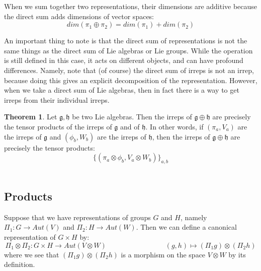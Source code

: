 \documentclass[11pt, oneside]{article}   	%
\theoremstyle{definition}
\newtheorem{theorem}{Theorem}[section]
\begin{document}
When we sum together two representations, their dimensions are additive because the direct sum adds 
dimensions of vector spaces:
\begin{equation}
	dim(\pi_1\oplus\pi_2) = dim(\pi_1) + dim(\pi_2)
\end{equation}

An important thing to note is that the direct sum of representations is not the same things as the direct 
sum of Lie algebras or Lie groups. While the operation is still defined in this case, it acts on different objects, 
and can have profound differences. Namely, note that (of course) the direct sum of irreps is not an irrep, 
because doing this gives an explicit decomposition of the representation. However, when we take a direct 
sum of Lie algebras, then in fact there is a way to get irreps from their individual irreps.
\begin{theorem}
	Let $\mathfrak g, \mathfrak h$ be two Lie algebras. Then the irreps of $\mathfrak g\oplus\mathfrak h$ are 
	precisely the tensor products of the irreps of $\mathfrak g$ and of $\mathfrak h$. In other words, if 
	$(\pi_a, V_a)$ are the irreps of $\mathfrak g$ and $(\phi_b, W_b)$ are the irreps of $\mathfrak h$, then 
	the irreps of $\mathfrak g\oplus\mathfrak h$ are precisely the tensor products:
	\begin{equation}
		\{(\pi_a\otimes\phi_b, V_a\otimes W_b)\}_{a, b}
	\end{equation}~
	\label{theorem:sum_irreps}
\end{theorem}

\subsection{Products}

Suppose that we have representations of groups $G$ and $H$, namely $\Pi_1 : G\rightarrow Aut(V)$ and 
$\Pi_2 : H\rightarrow Aut(W)$. Then we can define a canonical representation of $G\times H$ by:
\begin{equation}
	\Pi_1\otimes\Pi_2 : G\times H\rightarrow Aut(V\otimes W)\;\;\;\;\;\;\;\;\;\;\;\;\;\;\;\;\;\;\;\;\;\;\;\;\;\;\;\;\;\;
	(g, h)\mapsto (\Pi_1 g)\otimes (\Pi_2 h)
\end{equation}
where we see that $(\Pi_1 g)\otimes (\Pi_2 h)$ is a morphism on the space $V\otimes W$ by its 
definition. 
\end{document}
